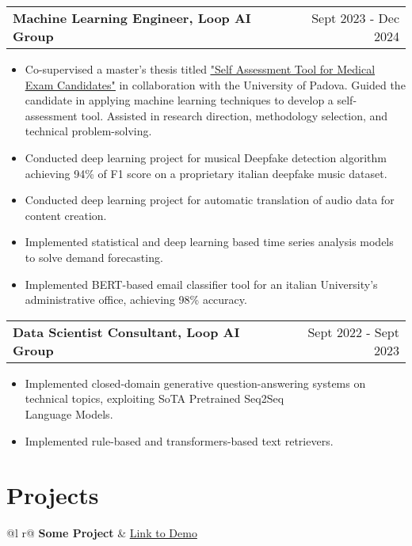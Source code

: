\documentclass[a4paper,12pt]{article}
\makeatletter
\newenvironment{joblong}[2]
    {
    \begin{tabularx}{\linewidth}{@{}l X r@{}}
    \textbf{#1} & \hfill &  #2 \\[3.75pt]
    \end{tabularx}
    \begin{minipage}[t]{\linewidth}
    \begin{itemize}[nosep,after=\strut, leftmargin=1em, itemsep=3pt,label=--]
    }
    {
    \end{itemize}
    \end{minipage}    
    }
\makeatother
\begin{document}
\begin{joblong}{Machine Learning Engineer, Loop AI Group}{Sept 2023 - Dec 2024}
\item {
        Co-supervised a master's thesis titled \href{https://thesis.unipd.it/handle/20.500.12608/70905}{\underline{"Self Assessment Tool for Medical Exam Candidates"}} in collaboration with the University of Padova.
Guided the candidate in applying machine learning techniques to develop a self-assessment tool.
Assisted in research direction, methodology selection, and technical problem-solving.
        }
\item Conducted deep learning project for musical Deepfake detection algorithm achieving 94\% of F1 score on a proprietary italian deepfake music dataset.
\item Conducted deep learning project for automatic translation of audio data for content creation.
\item Implemented statistical and deep learning based time series analysis models to solve demand forecasting.
\item Implemented BERT-based email classifier tool for an italian University's administrative office, achieving 98\% accuracy.
\end{joblong}

\begin{joblong}{Data Scientist Consultant, Loop AI Group}{Sept 2022 - Sept 2023}
\item Implemented closed-domain generative question-answering systems on technical topics, exploiting SoTA Pretrained Seq2Seq \\Language Models.
\item Implemented rule-based and transformers-based text retrievers.
\end{joblong}
  
\section{Projects}

\begin{tabularx}{\linewidth}{ @{}l r@{} }
\textbf{Some Project} & \hfill \href{https://some-link.com}{Link to Demo} \\[3.75pt]
  \\
\end{tabularx}
\end{document}
